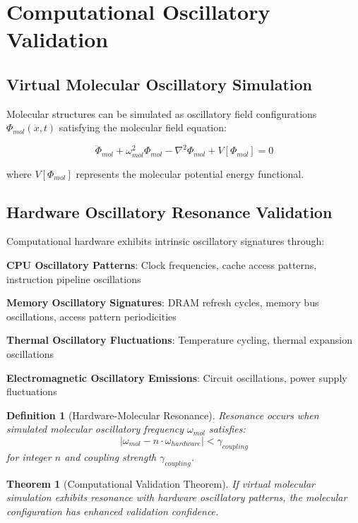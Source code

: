 \documentclass[11pt,a4paper]{article}
\newtheorem{theorem}{Theorem}
\newtheorem{definition}{Definition}
\begin{document}
\section{Computational Oscillatory Validation}

\subsection{Virtual Molecular Oscillatory Simulation}

Molecular structures can be simulated as oscillatory field configurations $\Phi_{mol}(x,t)$ satisfying the molecular field equation:

\begin{equation}
\ddot{\Phi}_{mol} + \omega_{mol}^2 \Phi_{mol} - \nabla^2\Phi_{mol} + V[\Phi_{mol}] = 0
\end{equation}

where $V[\Phi_{mol}]$ represents the molecular potential energy functional.

\subsection{Hardware Oscillatory Resonance Validation}

Computational hardware exhibits intrinsic oscillatory signatures through:

\textbf{CPU Oscillatory Patterns}: Clock frequencies, cache access patterns, instruction pipeline oscillations

\textbf{Memory Oscillatory Signatures}: DRAM refresh cycles, memory bus oscillations, access pattern periodicities

\textbf{Thermal Oscillatory Fluctuations}: Temperature cycling, thermal expansion oscillations

\textbf{Electromagnetic Oscillatory Emissions}: Circuit oscillations, power supply fluctuations

\begin{definition}[Hardware-Molecular Resonance]
Resonance occurs when simulated molecular oscillatory frequency $\omega_{mol}$ satisfies:
\begin{equation}
|\omega_{mol} - n \cdot \omega_{hardware}| < \gamma_{coupling}
\end{equation}
for integer $n$ and coupling strength $\gamma_{coupling}$.
\end{definition}

\begin{theorem}[Computational Validation Theorem]
If virtual molecular simulation exhibits resonance with hardware oscillatory patterns, the molecular configuration has enhanced validation confidence.
\end{theorem}
\end{document}
